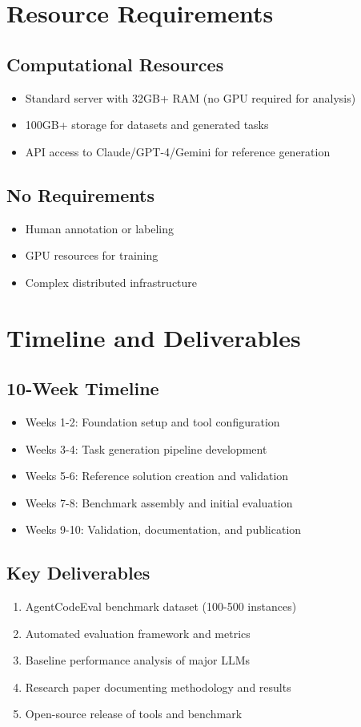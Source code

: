 \documentclass{article}
\begin{document}
\section{Resource Requirements}

\subsection{Computational Resources}
\begin{itemize}
    \item Standard server with 32GB+ RAM (no GPU required for analysis)
    \item 100GB+ storage for datasets and generated tasks
    \item API access to Claude/GPT-4/Gemini for reference generation
\end{itemize}

\subsection{No Requirements}
\begin{itemize}
    \item Human annotation or labeling
    \item GPU resources for training
    \item Complex distributed infrastructure
\end{itemize}

\section{Timeline and Deliverables}

\subsection{10-Week Timeline}
\begin{itemize}
    \item Weeks 1-2: Foundation setup and tool configuration
    \item Weeks 3-4: Task generation pipeline development
    \item Weeks 5-6: Reference solution creation and validation
    \item Weeks 7-8: Benchmark assembly and initial evaluation
    \item Weeks 9-10: Validation, documentation, and publication
\end{itemize}

\subsection{Key Deliverables}
\begin{enumerate}
    \item AgentCodeEval benchmark dataset (100-500 instances)
    \item Automated evaluation framework and metrics
    \item Baseline performance analysis of major LLMs
    \item Research paper documenting methodology and results
    \item Open-source release of tools and benchmark
\end{enumerate}
\end{document}
